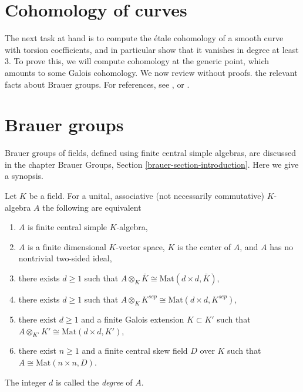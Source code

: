 \section{Cohomology of curves}
\label{section-cohomology-curves}

\noindent
The next task at hand is to compute the \'etale cohomology of a smooth curve
with torsion coefficients, and in particular show that it vanishes in degree at
least 3. To prove this, we will compute cohomology at the generic point, which
amounts to some Galois cohomology. We now review without proofs. the relevant
facts about Brauer groups. For references, see \cite{SerreCorpsLocaux},
\cite{SerreGaloisCohomology} or \cite{Weil}.




\section{Brauer groups}
\label{section-brauer-groups}

\noindent
Brauer groups of fields, defined using finite central simple algebras,
are discussed in the chapter
Brauer Groups, Section \ref{brauer-section-introduction}.
Here we give a synopsis.

\begin{theorem}
\label{theorem-central-simple-algebra}
Let $K$ be a field. For a unital, associative (not necessarily commutative)
$K$-algebra $A$ the following are equivalent
\begin{enumerate}
\item $A$ is finite central simple $K$-algebra,
\item $A$ is a finite dimensional $K$-vector space, $K$ is the center of $A$,
and $A$ has no nontrivial two-sided ideal,
\item there exists $d \geq 1$ such that
$A \otimes_K \bar K \cong \text{Mat}(d \times d, \bar K)$,
\item there exists $d \geq 1$ such that
$A \otimes_K K^{sep} \cong \text{Mat}(d \times d, K^{sep})$,
\item there exist $d \geq 1$ and a finite Galois extension $K \subset K'$
such that
$A \otimes_{K'} K' \cong \text{Mat}(d \times d, K')$,
\item there exist $n \geq 1$ and a finite central skew field $D$
over $K$ such that $A \cong \text{Mat}(n \times n, D)$.
\end{enumerate}
The integer $d$ is called the {\it degree} of $A$.
\end{theorem}

